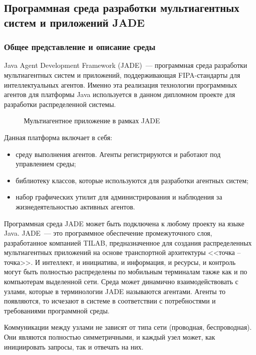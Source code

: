 \subsection{Программная среда разработки мультиагентных систем и приложений JADE}
\subsubsection{Общее представление и описание среды}
Java Agent Development Framework (JADE)~--- программная среда разработки мультиагентных систем и приложений, поддерживающая FIPA-стандарты для интеллектуальных агентов. Именно эта реализация технологии программных агентов для платформы Java используется в данном дипломном проекте для разработки распределенной системы.
\begin{figure}[h]
\caption{Мультиагентное приложение в рамках JADE}
\label{1:tanenbaum-agent}
\end{figure}

Данная платформа включает в себя:
\begin{itemize}
\item среду выполнения агентов. Агенты регистрируются и работают под управлением среды;
\item библиотеку классов, которые используются для разработки агентных систем;
\item набор графических утилит для администрирования и наблюдения за жизнедеятельностью активных агентов.
\end{itemize}

Программная среда JADE может быть подключена к любому проекту на языке Java.
JADE~--- это программное обеспечение промежуточного слоя, разработанное компанией TILAB, предназначенное для создания распределенных мультиагентных приложений на основе транспортной архитектуры <<точка -- точка>>. И интеллект, и инициатива, и информация, и ресурсы, и контроль могут быть полностью распределены по мобильным терминалам также как и по компьютерам выделенной сети. Среда может динамично взаимодействовать с узлами, которые в терминологии JADE называются агентами. Агенты то появляются, то исчезают в системе в соответствии с потребностями и требованиями программной среды.

Коммуникации между узлами не зависят от типа сети (проводная, беспроводная). Они являются полностью симметричными, и каждый узел может, как инициировать запросы, так и отвечать на них.

